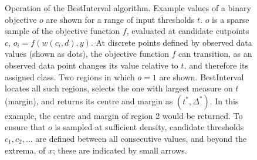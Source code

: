 \begin{figure}[!hp]
\caption[Operation of the BestInterval algorithm]{Operation of the BestInterval algorithm.  Example values of a binary objective $o$ are shown for a range of input thresholds $t$.  $o$ is a sparse sample of the objective function $f$, evaluated at candidate cutpoints $c$, $o_i = f(w(c_i,d),y)$.  At discrete points defined by observed data values (shown as dots), the objective function $f$ can transition, as an observed data point changes its value relative to $t$, and therefore its assigned class.  Two regions in which $o = 1$ are shown.  BestInterval locates all such regions, selects the one with largest measure on $t$ (margin), and returns its centre and margin as $(t^*, \Delta^*)$.  In this example, the centre and margin of region 2 would be returned.  To ensure that $o$ is sampled at sufficient density, candidate thresholds $c_1, c_2, \dots$ are defined between all consecutive values, and beyond the extrema, of $x$; these are indicated by small arrows.}
\label{fig:mess-bestinterval}
\end{figure}
